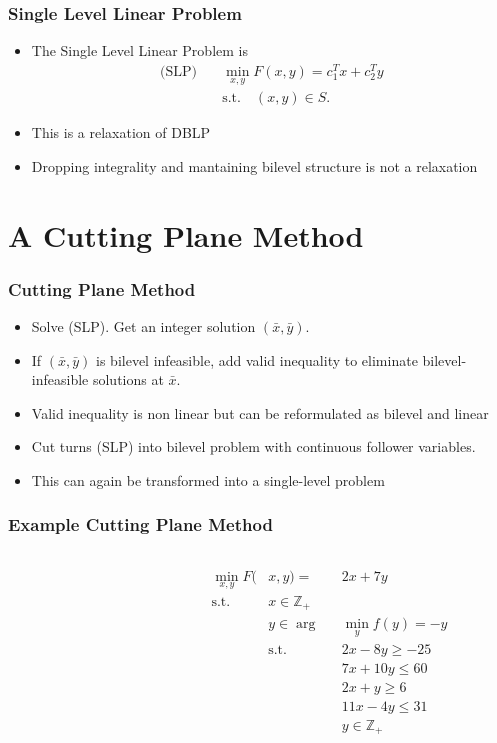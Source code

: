 \documentclass[11pt]{beamer}
\begin{document}
\begin{frame}
	\frametitle{Single Level Linear Problem}
	\begin{itemize}
	\item The Single Level Linear Problem is 
	\begin{align*}
		\text{(SLP)} \quad &\min_{x,y} F(x,y) = c_1^Tx +c_2^Ty \\
		&\text{s.t.} \quad (x,y) \in S.
	\end{align*}
	\item This is a relaxation of DBLP
	\item Dropping integrality and mantaining bilevel structure is not a relaxation
	\end{itemize}
\end{frame}

\section{A Cutting Plane Method}
\begin{frame}
	\frametitle{Cutting Plane Method}
	\begin{itemize}
		\item Solve (SLP). Get an integer solution $(\bar x, \bar y)$.
		\item If $(\bar x, \bar y)$ is bilevel infeasible, add valid inequality to eliminate bilevel-infeasible solutions at $\bar x$.
		\item Valid inequality is non linear but can be reformulated as bilevel and linear
		\item Cut turns (SLP) into bilevel problem with continuous follower variables. 
		\item This can again be transformed into a single-level problem
	\end{itemize}
\end{frame}

\begin{frame}
	\frametitle{Example Cutting Plane Method}
	\begin{columns}[T] %
		\begin{column}{.48\textwidth}
			
		\end{column}%
		\hfill%
		\begin{column}{.48\textwidth}
			\begin{alignat*}{2}
			\min_{x,y} F(&x,y) =&& 2x + 7y \\
			\text{s.t.}\quad &x \in \mathbb{Z}_+&& \\
			&y \in \arg&& \min_y f(y) = -y \\
			&\text{s.t.}\quad &&2x - 8y \ge -25 \\
			& &&7x + 10y \le 60 \\
			& &&2x + y \ge 6 \\
			& &&11x - 4y \le 31 \\
			& &&y \in \mathbb{Z}_+ 
			\end{alignat*}
		\end{column}%
	\end{columns}
	\end{frame}
	
\end{document}
